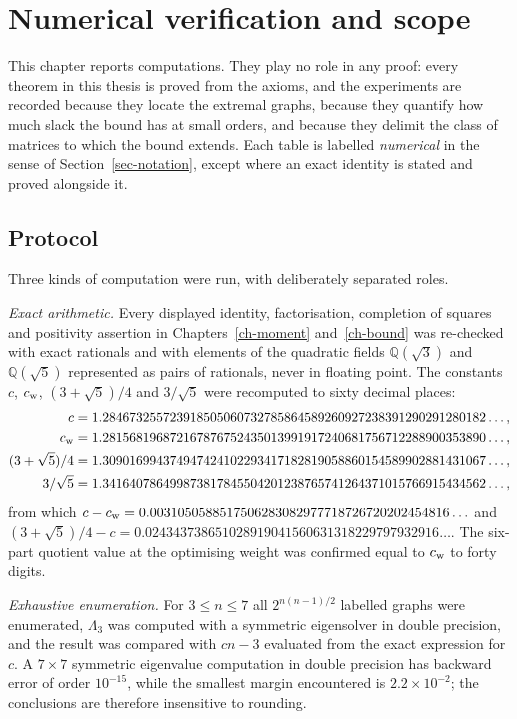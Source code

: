 \chapter{Numerical verification and scope}\label{ch-numerical}

This chapter reports computations. They play no role in any proof: every
theorem in this thesis is proved from the axioms, and the experiments are
recorded because they locate the extremal graphs, because they quantify how
much slack the bound has at small orders, and because they delimit the class
of matrices to which the bound extends. Each table is labelled
\emph{numerical} in the sense of Section~\ref{sec-notation}, except where an
exact identity is stated and proved alongside it.

\section{Protocol}\label{sec-protocol}
Three kinds of computation were run, with deliberately separated roles.

\emph{Exact arithmetic.} Every displayed identity, factorisation, completion
of squares and positivity assertion in Chapters~\ref{ch-moment}
and~\ref{ch-bound} was re-checked with exact rationals and with elements of
the quadratic fields $\mathbb Q(\sqrt3)$ and $\mathbb Q(\sqrt5)$ represented
as pairs of rationals, never in floating point. The constants $c$, $c_{\mathrm{w}}$,
$(3+\sqrt5)/4$ and $3/\sqrt5$ were recomputed to sixty decimal places:
\begin{align*}
 c&=1.284673255723918505060732785864589260927238391290291280182\ldots,\\
 c_{\mathrm{w}}&=1.281568196872167876752435013991917240681756712288900353890\ldots,\\
 (3+\sqrt5)/4&=1.309016994374947424102293417182819058860154589902881431067\ldots,\\
 3/\sqrt5&=1.341640786499873817845504201238765741264371015766915434562\ldots,
\end{align*}
from which $c-c_{\mathrm{w}}=0.0031050588517506283082977718726720202454816\ldots$ and
$(3+\sqrt5)/4-c=0.024343738651028919041560631318229797932916\ldots$. The
six-part quotient value at the optimising weight was confirmed equal to
$c_{\mathrm{w}}$ to forty digits.

\emph{Exhaustive enumeration.} For $3\le n\le7$ all $2^{n(n-1)/2}$ labelled
graphs were enumerated, $\Lambda_3$ was computed with a symmetric eigensolver
in double precision, and the result was compared with $cn-3$ evaluated from
the exact expression for $c$. A $7\times7$ symmetric eigenvalue computation in
double precision has backward error of order $10^{-15}$, while the smallest
margin encountered is $2.2\times10^{-2}$; the conclusions are therefore
insensitive to rounding.


